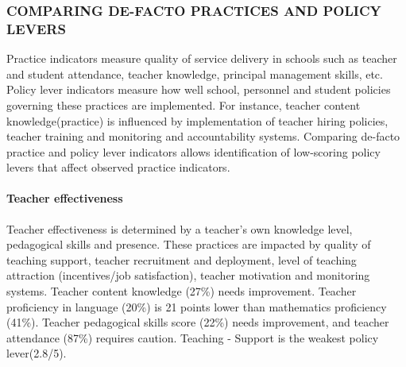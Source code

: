 \documentclass[
  twocolumn]{article}
\begin{document}
\hypertarget{comparing-de-facto-practices-and-policy-levers}{%
\subsubsection{\texorpdfstring{\textbf{COMPARING DE-FACTO PRACTICES AND
POLICY
LEVERS}}{COMPARING DE-FACTO PRACTICES AND POLICY LEVERS}}\label{comparing-de-facto-practices-and-policy-levers}}

Practice indicators measure quality of service delivery in schools such
as teacher and student attendance, teacher knowledge, principal
management skills, etc. Policy lever indicators measure how well school,
personnel and student policies governing these practices are
implemented. For instance, teacher content knowledge(practice) is
influenced by implementation of teacher hiring policies, teacher
training and monitoring and accountability systems. Comparing de-facto
practice and policy lever indicators allows identification of
low-scoring policy levers that affect observed practice indicators.

\hypertarget{teacher-effectiveness}{%
\paragraph{\texorpdfstring{\textbf{Teacher
effectiveness}}{Teacher effectiveness}}\label{teacher-effectiveness}}

Teacher effectiveness is determined by a teacher's own knowledge level,
pedagogical skills and presence. These practices are impacted by quality
of teaching support, teacher recruitment and deployment, level of
teaching attraction (incentives/job satisfaction), teacher motivation
and monitoring systems. Teacher content knowledge (27\%) needs
improvement. Teacher proficiency in language (20\%) is 21 points lower
than mathematics proficiency (41\%). Teacher pedagogical skills score
(22\%) needs improvement, and teacher attendance (87\%) requires
caution. Teaching - Support is the weakest policy lever(2.8/5).
\end{document}
